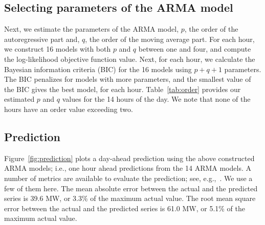 \documentclass[review]{elsarticle}
\begin{document}
\subsection{Selecting parameters of the ARMA model}
Next, we estimate the parameters of the ARMA model, $p$, the order of the 
autoregressive part and, $q$, the order of the moving average part. For each 
hour, we construct 16 models with both $p$ and $q$ between one and four, and 
compute 
the log-likelihood objective function value. Next, for each hour, we calculate 
the Bayesian information criteria (BIC) for the 16 models using $p + q + 1$ 
parameters.  The BIC penalizes for models with more parameters, and the 
smallest value of the BIC gives the best model, for each 
hour. Table~\ref{tab:order} provides our estimated $p$ and $q$  values for 
the 14 hours of the day. We note that none of the hours have an order value 
exceeding two.

\begin{table}[!htb]
\centering
\caption{Estimated $p$ and $q$ values for ARMA($p,q$) models for 14 hours of 
the day}
\label{tab:order}
\end{table}

\subsection{Prediction}

Figure~\ref{fig:prediction} plots a day-ahead prediction using the above 
constructed ARMA models; i.e., one hour ahead predictions from the 14 ARMA 
models. A number of metrics are available to evaluate the prediction; see, 
e.g.,~\cite{coimbra2013overview}. We use a few of them here. The mean absolute 
error between the actual 
and the predicted series is 
39.6 MW, or  3.3\% of the maximum actual value. The root mean square 
error between the actual and the predicted series is 
61.0 MW, or  5.1\% of the maximum actual value. 
\end{document}
